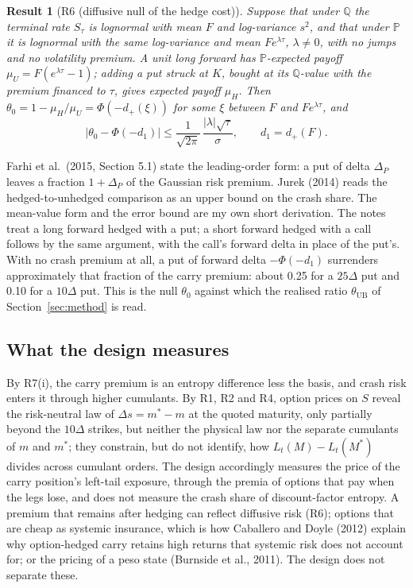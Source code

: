 \documentclass[11pt]{article}
\theoremstyle{result}
\newtheorem*{result}{Result}
\newcommand{\Q}{\mathbb{Q}}
\renewcommand{\P}{\mathbb{P}}
\newcommand{\thUB}{\theta_{\mathrm{UB}}}
\newcommand{\D}{\Delta}
\begin{document}
\begin{result}[R6 (diffusive null of the hedge cost)]
Suppose that under $\Q$ the terminal rate $S_\tau$ is lognormal with mean $F$ and log-variance $s^2$, and that under $\P$ it is lognormal with the same log-variance and mean $Fe^{\lambda\tau}$, $\lambda\ne0$, with no jumps and no volatility premium. A unit long forward has $\P$-expected payoff $\mu_U=F(e^{\lambda\tau}-1)$; adding a put struck at $K$, bought at its $\Q$-value with the premium financed to $\tau$, gives expected payoff $\mu_H$. Then $\theta_0=1-\mu_H/\mu_U=\Phi(-d_+(\xi))$ for some $\xi$ between $F$ and $Fe^{\lambda\tau}$, and
\[
\bigl|\theta_0-\Phi(-d_1)\bigr|\le\frac{1}{\sqrt{2\pi}}\,\frac{|\lambda|\sqrt\tau}{\sigma},\qquad d_1=d_+(F).
\]
\end{result}

Farhi et al.\ (2015, Section 5.1) state the leading-order form: a put of delta $\D_P$ leaves a fraction $1+\D_P$ of the Gaussian risk premium. Jurek (2014) reads the hedged-to-unhedged comparison as an upper bound on the crash share. The mean-value form and the error bound are my own short derivation. The notes treat a long forward hedged with a put; a short forward hedged with a call follows by the same argument, with the call's forward delta in place of the put's. With no crash premium at all, a put of forward delta $-\Phi(-d_1)$ surrenders approximately that fraction of the carry premium: about 0.25 for a $25\D$ put and 0.10 for a $10\D$ put. This is the null $\theta_0$ against which the realised ratio $\thUB$ of Section~\ref{sec:method} is read.

\subsection{What the design measures}

By R7(i), the carry premium is an entropy difference less the basis, and crash risk enters it through higher cumulants. By R1, R2 and R4, option prices on $S$ reveal the risk-neutral law of $\D s=m^*-m$ at the quoted maturity, only partially beyond the $10\D$ strikes, but neither the physical law nor the separate cumulants of $m$ and $m^*$; they constrain, but do not identify, how $L_t(M)-L_t(M^*)$ divides across cumulant orders. The design accordingly measures the price of the carry position's left-tail exposure, through the premia of options that pay when the legs lose, and does not measure the crash share of discount-factor entropy. A premium that remains after hedging can reflect diffusive risk (R6); options that are cheap as systemic insurance, which is how Caballero and Doyle (2012) explain why option-hedged carry retains high returns that systemic risk does not account for; or the pricing of a peso state (Burnside et al., 2011). The design does not separate these.
\end{document}
